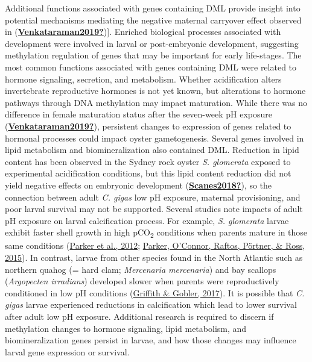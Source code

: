\documentclass [11pt, proquest] {uwthesis}[2015/03/03]
\begin{document}
Additional functions associated with genes containing DML provide insight into potential mechanisms mediating the negative maternal carryover effect observed in (\protect\hyperlink{ref-Venkataraman2019}{\textbf{Venkataraman2019?}}){]}. Enriched biological processes associated with development were involved in larval or post-embryonic development, suggesting methylation regulation of genes that may be important for early life-stages. The most common functions associated with genes containing DML were related to hormone signaling, secretion, and metabolism. Whether acidification alters invertebrate reproductive hormones is not yet known, but alterations to hormone pathways through DNA methylation may impact maturation. While there was no difference in female maturation status after the seven-week pH exposure (\protect\hyperlink{ref-Venkataraman2019}{\textbf{Venkataraman2019?}}), persistent changes to expression of genes related to hormonal processes could impact oyster gametogenesis. Several genes involved in lipid metabolism and biomineralization also contained DML. Reduction in lipid content has been observed in the Sydney rock oyster \emph{S. glomerata} exposed to experimental acidification conditions, but this lipid content reduction did not yield negative effects on embryonic development (\protect\hyperlink{ref-Scanes2018}{\textbf{Scanes2018?}}), so the connection between adult \emph{C. gigas} low pH exposure, maternal provisioning, and poor larval survival may not be supported. Several studies note impacts of adult pH exposure on larval calcification process. For example, \emph{S. glomerata} larvae exhibit faster shell growth in high pCO\textsubscript{2} conditions when parents mature in those same conditions (\protect\hyperlink{ref-Parker2012}{Parker et al., 2012}; \protect\hyperlink{ref-Parker2015}{Parker, O'Connor, Raftos, Pörtner, \& Ross, 2015}). In contrast, larvae from other species found in the North Atlantic such as northern quahog (= hard clam; \emph{Mercenaria mercenaria}) and bay scallops (\emph{Argopecten irradians}) developed slower when parents were reproductively conditioned in low pH conditions (\protect\hyperlink{ref-Griffith2017}{Griffith \& Gobler, 2017}). It is possible that \emph{C. gigas} larvae experienced reductions in calcification which lead to lower survival after adult low pH exposure. Additional research is required to discern if methylation changes to hormone signaling, lipid metabolism, and biomineralization genes persist in larvae, and how those changes may influence larval gene expression or survival.
\end{document}
